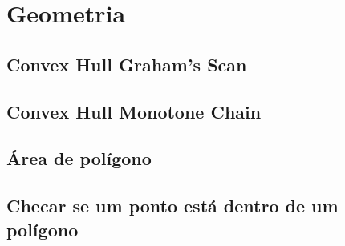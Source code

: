 \section{Geometria}

\subsection{Convex Hull Graham's Scan}


\subsection{Convex Hull Monotone Chain}


\subsection{Área de polígono}


\subsection{Checar se um ponto está dentro de um polígono}
